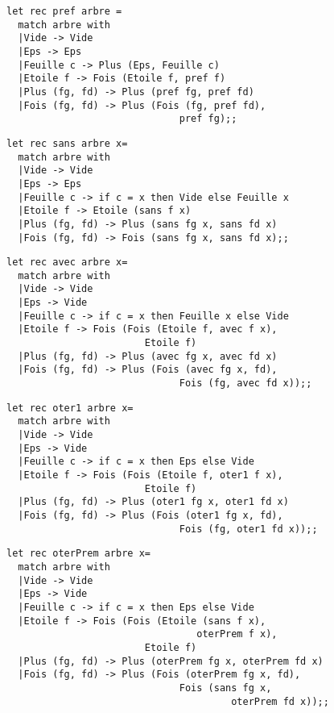\begin{Answer}
\begin{lstlisting}
let rec pref arbre = 
  match arbre with
  |Vide -> Vide
  |Eps -> Eps
  |Feuille c -> Plus (Eps, Feuille c)
  |Etoile f -> Fois (Etoile f, pref f)
  |Plus (fg, fd) -> Plus (pref fg, pref fd)
  |Fois (fg, fd) -> Plus (Fois (fg, pref fd), 
                              pref fg);; 
\end{lstlisting}
\begin{lstlisting}
let rec sans arbre x= 
  match arbre with
  |Vide -> Vide
  |Eps -> Eps
  |Feuille c -> if c = x then Vide else Feuille x
  |Etoile f -> Etoile (sans f x)
  |Plus (fg, fd) -> Plus (sans fg x, sans fd x)
  |Fois (fg, fd) -> Fois (sans fg x, sans fd x);; 
\end{lstlisting}
\begin{lstlisting}
let rec avec arbre x= 
  match arbre with
  |Vide -> Vide
  |Eps -> Vide
  |Feuille c -> if c = x then Feuille x else Vide
  |Etoile f -> Fois (Fois (Etoile f, avec f x), 
                        Etoile f)
  |Plus (fg, fd) -> Plus (avec fg x, avec fd x)
  |Fois (fg, fd) -> Plus (Fois (avec fg x, fd),
                              Fois (fg, avec fd x));; 
\end{lstlisting}
\begin{lstlisting}
let rec oter1 arbre x= 
  match arbre with
  |Vide -> Vide
  |Eps -> Vide
  |Feuille c -> if c = x then Eps else Vide
  |Etoile f -> Fois (Fois (Etoile f, oter1 f x), 
                        Etoile f)
  |Plus (fg, fd) -> Plus (oter1 fg x, oter1 fd x)
  |Fois (fg, fd) -> Plus (Fois (oter1 fg x, fd),
                              Fois (fg, oter1 fd x));; 
\end{lstlisting}
\begin{lstlisting}
let rec oterPrem arbre x= 
  match arbre with
  |Vide -> Vide
  |Eps -> Vide
  |Feuille c -> if c = x then Eps else Vide
  |Etoile f -> Fois (Fois (Etoile (sans f x), 
                                 oterPrem f x), 
                        Etoile f)
  |Plus (fg, fd) -> Plus (oterPrem fg x, oterPrem fd x)
  |Fois (fg, fd) -> Plus (Fois (oterPrem fg x, fd),
                              Fois (sans fg x, 
                                       oterPrem fd x));; 
\end{lstlisting}
\end{Answer}
